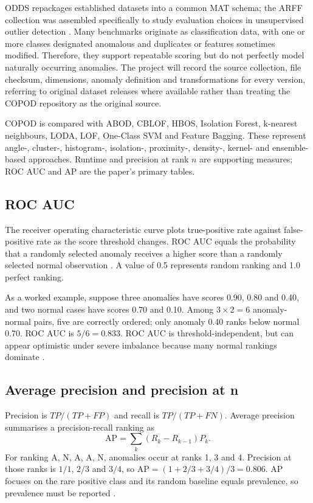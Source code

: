 \documentclass[11pt,a4paper,twocolumn]{article}
\begin{document}
ODDS repackages established datasets into a common MAT schema; the ARFF collection was assembled specifically to study evaluation choices in unsupervised outlier detection \citep{campos2016}. Many benchmarks originate as classification data, with one or more classes designated anomalous and duplicates or features sometimes modified. Therefore, they support repeatable scoring but do not perfectly model naturally occurring anomalies. The project will record the source collection, file checksum, dimensions, anomaly definition and transformations for every version, referring to original dataset releases where available rather than treating the COPOD repository as the original source.

COPOD is compared with ABOD, CBLOF, HBOS, Isolation Forest, k-nearest neighbours, LODA, LOF, One-Class SVM and Feature Bagging. These represent angle-, cluster-, histogram-, isolation-, proximity-, density-, kernel- and ensemble-based approaches. Runtime and precision at rank $n$ are supporting measures; ROC AUC and AP are the paper's primary tables.

\subsection{ROC AUC}

The receiver operating characteristic curve plots true-positive rate against false-positive rate as the score threshold changes. ROC AUC equals the probability that a randomly selected anomaly receives a higher score than a randomly selected normal observation \citep{hanley1982}. A value of 0.5 represents random ranking and 1.0 perfect ranking.

As a worked example, suppose three anomalies have scores 0.90, 0.80 and 0.40, and two normal cases have scores 0.70 and 0.10. Among $3\times2=6$ anomaly-normal pairs, five are correctly ordered; only anomaly 0.40 ranks below normal 0.70. ROC AUC is $5/6=0.833$. ROC AUC is threshold-independent, but can appear optimistic under severe imbalance because many normal rankings dominate \citep{saito2015}.

\subsection{Average precision and precision at n}

Precision is $TP/(TP+FP)$ and recall is $TP/(TP+FN)$. Average precision summarises a precision-recall ranking as
\begin{equation}
\mathrm{AP}=\sum_k (R_k-R_{k-1})P_k .
\end{equation}
For ranking A, N, A, A, N, anomalies occur at ranks 1, 3 and 4. Precision at those ranks is $1/1$, $2/3$ and $3/4$, so $\mathrm{AP}=(1+2/3+3/4)/3=0.806$. AP focuses on the rare positive class and its random baseline equals prevalence, so prevalence must be reported \citep{davis2006,saito2015}.
\end{document}
